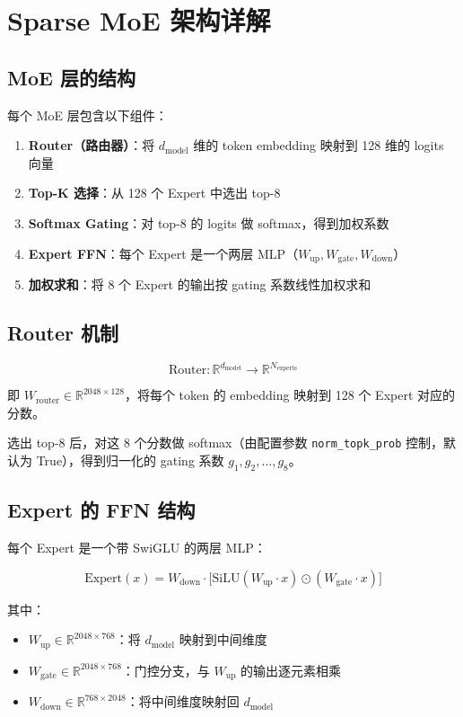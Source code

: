 \section{Sparse MoE 架构详解}

\subsection{MoE 层的结构}

每个 MoE 层包含以下组件：

\begin{enumerate}
  \item \textbf{Router（路由器）}：将 $d_{\text{model}}$ 维的 token embedding 映射到 128 维的 logits 向量
  \item \textbf{Top-K 选择}：从 128 个 Expert 中选出 top-8
  \item \textbf{Softmax Gating}：对 top-8 的 logits 做 softmax，得到加权系数
  \item \textbf{Expert FFN}：每个 Expert 是一个两层 MLP（$W_{\text{up}}, W_{\text{gate}}, W_{\text{down}}$）
  \item \textbf{加权求和}：将 8 个 Expert 的输出按 gating 系数线性加权求和
\end{enumerate}

\subsection{Router 机制}

$$
\text{Router}: \mathbb{R}^{d_{\text{model}}} \to \mathbb{R}^{N_{\text{experts}}}
$$

即 $W_{\text{router}} \in \mathbb{R}^{2048 \times 128}$，将每个 token 的 embedding 映射到 128 个 Expert 对应的分数。

选出 top-8 后，对这 8 个分数做 softmax（由配置参数 \texttt{norm\_topk\_prob} 控制，默认为 True），得到归一化的 gating 系数 $g_1, g_2, \ldots, g_8$。

\subsection{Expert 的 FFN 结构}

每个 Expert 是一个带 SwiGLU 的两层 MLP：

$$
\text{Expert}(x) = W_{\text{down}} \cdot \big[ \text{SiLU}(W_{\text{up}} \cdot x) \odot (W_{\text{gate}} \cdot x) \big]
$$

其中：
\begin{itemize}
  \item $W_{\text{up}} \in \mathbb{R}^{2048 \times 768}$：将 $d_{\text{model}}$ 映射到中间维度
  \item $W_{\text{gate}} \in \mathbb{R}^{2048 \times 768}$：门控分支，与 $W_{\text{up}}$ 的输出逐元素相乘
  \item $W_{\text{down}} \in \mathbb{R}^{768 \times 2048}$：将中间维度映射回 $d_{\text{model}}$
\end{itemize}


